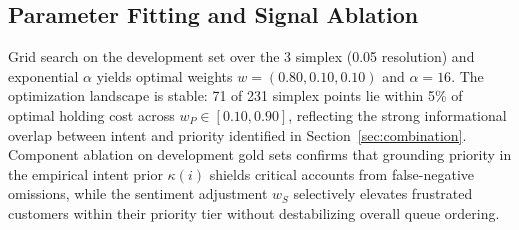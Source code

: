 \subsection{Parameter Fitting and Signal Ablation}

Grid search on the development set over the 3 simplex (0.05 resolution) and exponential $\alpha$ yields optimal weights $w = (0.80, 0.10, 0.10)$ and $\alpha = 16$. The optimization landscape is stable: 71 of 231 simplex points lie within 5\% of optimal holding cost across $w_P \in [0.10, 0.90]$, reflecting the strong informational overlap between intent and priority identified in Section~\ref{sec:combination}. Component ablation on development gold sets confirms that grounding priority in the empirical intent prior $\kappa(i)$ shields critical accounts from false-negative omissions, while the sentiment adjustment $w_S$ selectively elevates frustrated customers within their priority tier without destabilizing overall queue ordering.
